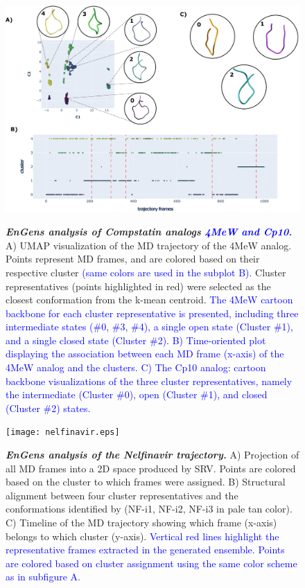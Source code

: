 \documentclass[unnumsec,webpdf,contemporary,large,numsquare]{oup-authoring-template}%
\theoremstyle{thmstyleone}%
\theoremstyle{thmstyletwo}%
\theoremstyle{thmstylethree}%
\begin{document}
\begin{figure}[!t]%
\centering
{\includegraphics[scale=0.2]{compstatin.eps}}
\caption{\textbf{\textit{ EnGens analysis of Compstatin analogs \textcolor{blue}{4MeW and Cp10.}}} A) UMAP visualization of the MD trajectory of the 4MeW analog. Points represent MD frames, and are colored based on their respective cluster \textcolor{blue}{(same colors are used in the subplot B).} Cluster representatives (points highlighted in red) were selected as the closest conformation from the k-mean centroid. \textcolor{blue}{The 4MeW cartoon backbone for each cluster representative is presented, including three intermediate states (\#0, \#3, \#4), a single open state (Cluster \#1), and a single closed state (Cluster \#2). B) Time-oriented plot displaying the association between each MD frame (x-axis) of the 4MeW analog and the clusters. C) The Cp10 analog: cartoon backbone visualizations of the three cluster representatives, namely the intermediate (Cluster \#0), open (Cluster \#1), and closed (Cluster \#2) states. }}
\label{fig-res2}
\end{figure}

\begin{figure}[!t]%
\centering
{\texttt{[image: nelfinavir.eps]}}
\caption{\textbf{\textit{EnGens analysis of the Nelfinavir trajectory. }} A) Projection of all MD frames into a 2D space produced by SRV. Points are colored based on the cluster to which frames were assigned. B) Structural alignment between four cluster representatives and the conformations identified by \citep{antunes_new_2014} (NF-i1, NF-i2, NF-i3 in pale tan color). C) Timeline of the MD trajectory showing which frame (x-axis) belongs to which cluster (y-axis). \textcolor{blue}{Vertical red lines highlight the representative frames extracted in the generated ensemble. Points are colored based on cluster assignment using the same color scheme as in subfigure A.}}
\label{fig-res3}
\end{figure}
\end{document}
